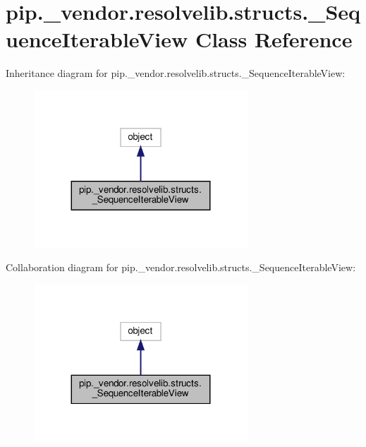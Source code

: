 \hypertarget{classpip_1_1__vendor_1_1resolvelib_1_1structs_1_1__SequenceIterableView}{}\section{pip.\+\_\+vendor.\+resolvelib.\+structs.\+\_\+\+Sequence\+Iterable\+View Class Reference}
\label{classpip_1_1__vendor_1_1resolvelib_1_1structs_1_1__SequenceIterableView}


Inheritance diagram for pip.\+\_\+vendor.\+resolvelib.\+structs.\+\_\+\+Sequence\+Iterable\+View\+:
\nopagebreak
\begin{figure}[H]
\begin{center}
\leavevmode
\includegraphics[width=227pt]{classpip_1_1__vendor_1_1resolvelib_1_1structs_1_1__SequenceIterableView__inherit__graph}
\end{center}
\end{figure}


Collaboration diagram for pip.\+\_\+vendor.\+resolvelib.\+structs.\+\_\+\+Sequence\+Iterable\+View\+:
\nopagebreak
\begin{figure}[H]
\begin{center}
\leavevmode
\includegraphics[width=227pt]{classpip_1_1__vendor_1_1resolvelib_1_1structs_1_1__SequenceIterableView__coll__graph}
\end{center}
\end{figure}
